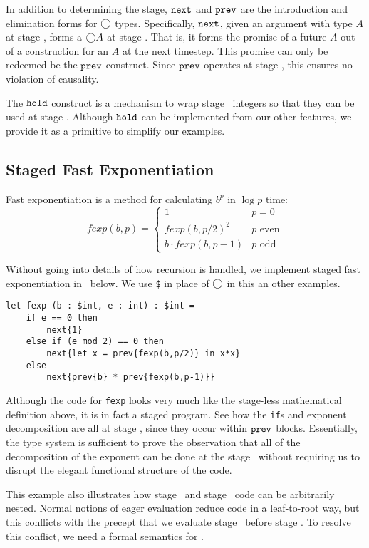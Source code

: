 In addition to determining the stage, ${\tt next}$ and ${\tt prev}$ are the introduction and elimination forms for $\bigcirc$ types.
Specifically, ${\tt next}$, given an argument with type $A$ at stage \bbtwo, forms a $\bigcirc A$ at stage \bbone.  
That is, it forms the promise of a future $A$ out of a construction for an $A$ at the next timestep.
This promise can only be redeemed be the ${\tt prev}$ construct.  
Since ${\tt prev}$ operates at stage \bbtwo, this ensures no violation of causality.

The ${\tt hold}$ construct is a mechanism to wrap stage \bbone~integers so that they can be used at stage \bbtwo.  
Although ${\tt hold}$ can be implemented from our other features, 
we provide it as a primitive to simplify our examples. 

\subsection {Staged Fast Exponentiation}

Fast exponentiation is a method for calculating $b^p$ in $\log p$ time:
\[
	\mathit{fexp}(b,p) = \left \{ \begin{array}{ll} 
		1 &  p = 0 \\ 
		\mathit{fexp}(b,p/2)^2 & p \text{ even} \\ 
		b \cdot \mathit{fexp}(b,p-1) & p \text{ odd} \end{array}
	\right .
\]

Without going into details of how recursion is handled, we implement staged fast exponentiation in \lang~below.  
We use {\tt \$} in place of $\bigcirc$ in this an other examples.

\begin{lstlisting} 
let fexp (b : $int, e : int) : $int =
	if e == 0 then
		next{1}
	else if (e mod 2) == 0 then
		next{let x = prev{fexp(b,p/2)} in x*x}
	else
		next{prev{b} * prev{fexp(b,p-1)}}		
\end{lstlisting}

Although the code for {\tt fexp} looks very much like the stage-less mathematical definition above, it is in fact a staged program.  
See how the {\tt if}s and exponent decomposition are all at stage \bbone, since they occur within ${\tt prev}$ blocks.  
Essentially, the type system is sufficient to prove the observation that all of the decomposition of the exponent can be done at the stage \bbone~without requiring us to disrupt the elegant functional structure of the code.

This example also illustrates how stage \bbone~and stage \bbtwo~code can be arbitrarily nested.  Normal notions of eager evaluation reduce code in a leaf-to-root way, but this conflicts with the precept that we evaluate stage \bbone~before stage \bbtwo.  
To resolve this conflict, we need a formal semantics for \lang.

